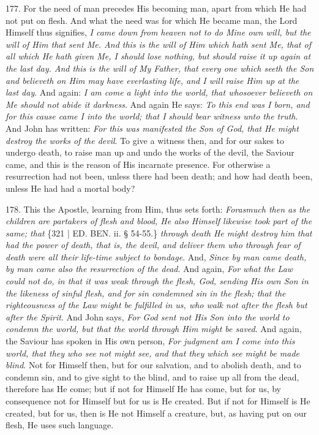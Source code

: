 177. For the need of man
precedes His becoming man, apart from which He had not put on flesh.
And what the need was for which He became man, the Lord Himself thus
signifies, \emph{I came down from heaven not to do Mine own will, but the
will of Him that sent Me. And this is the will of Him which hath sent
Me, that of all which He hath given Me, I should lose nothing, but
should raise it up again at the last day. And this is the will of My
Father, that every one which seeth the Son and believeth on Him may
have everlasting life, and I will raise Him up at the last day}.
And again: \emph{I am come a light into the world, that whosoever
believeth on Me should not abide it darkness}. And again He says: \emph{To
this end was I born, and for this cause came I into the world; that I}
\emph{should bear witness unto the truth}. And John has written: \emph{For
this was manifested the Son of God, that He might destroy the works of
the devil}. To give a witness then, and for our sakes to undergo
death, to raise man up and undo the works of the devil, the Saviour
came, and this is the reason of His incarnate presence. For otherwise
a resurrection had not been, unless there had been death; and how had
death been, unless He had had a mortal body?

178. This the Apostle,
learning from Him, thus sets forth: \emph{Forasmuch then as the children
are partakers of flesh and blood, He also Himself likewise took part
of the same; that} \{321 | ED.
BEN. ii. § 54-55.\} \emph{through death He might
destroy him that had the power of death, that is, the devil, and
deliver them who through fear of death were all their life-time
subject to bondage}. And, \emph{Since by man came death, by man came
also the resurrection of the dead}. And again, \emph{For what the Law
could not do, in that it was weak through the flesh, God, sending His
own Son in the likeness of sinful flesh, and for sin condemned sin in
the flesh; that the righteousness of the Law might be fulfilled in us,
who walk not after the flesh but after the Spirit}. And John says, \emph{For
God sent not His Son into the world to condemn the world, but that the
world through Him might be saved}. And again, the Saviour has
spoken in His own person, \emph{For judgment am I come into this world,
that they who see not might see, and that they which see might be made
blind}. Not for Himself then, but for our salvation, and to abolish
death, and to condemn sin, and to give sight to the blind, and to
raise up all from the dead, therefore has He come; but if not for
Himself He has come, but for us, by consequence not for Himself but
for us is He created. But if not for Himself is He created, but for
us, then is He not Himself a creature, but, as having put on our
flesh, He uses such language.

